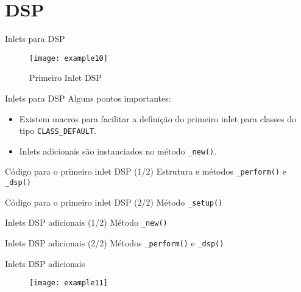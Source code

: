 \section{DSP}


\begin{frame}{Inlets para DSP}
\begin{figure}[h!]
\centering
\texttt{[image: example10]}
\caption{Primeiro Inlet DSP}
\end{figure}
\end{frame}


\begin{frame}{Inlets para DSP}
Alguns pontos importantes:
\begin{itemize}
\item Existem macros para facilitar a definição do primeiro inlet para classes
do tipo \texttt{CLASS\_DEFAULT}.
\item Inlets adicionais são instanciados no método \texttt{\_new()}.
\end{itemize}
\end{frame}


\begin{frame}{Código para o primeiro inlet DSP (1/2)}
{Estrutura e métodos \texttt{\_perform()} e \texttt{\_dsp()}}

\end{frame}


\begin{frame}{Código para o primeiro inlet DSP (2/2)}
{Método \texttt{\_setup()}}

\end{frame}


\begin{frame}{Inlets DSP adicionais (1/2)}
{Método \texttt{\_new()}}

\end{frame}


\begin{frame}{Inlets DSP adicionais (2/2)}
{Métodos \texttt{\_perform()} e \texttt{\_dsp()}}

\end{frame}


\begin{frame}{Inlets DSP adicionais}
\begin{figure}[h!]
\centering
\texttt{[image: example11]}
\end{figure}
\end{frame}


